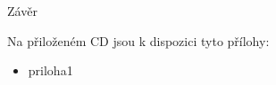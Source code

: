 \documentclass[twoside,12pt]{article}
\begin{document}


%
%


% 
\newpage 


% 
\newpage


% 
\newpage

%
%
Závěr

%

%
%
Na přiloženém CD jsou k dispozici tyto přílohy: 
\begin{itemize}
\item priloha1
\end{itemize}


% 
% 
\begin{literatura}

\end{literatura}
\end{document}
